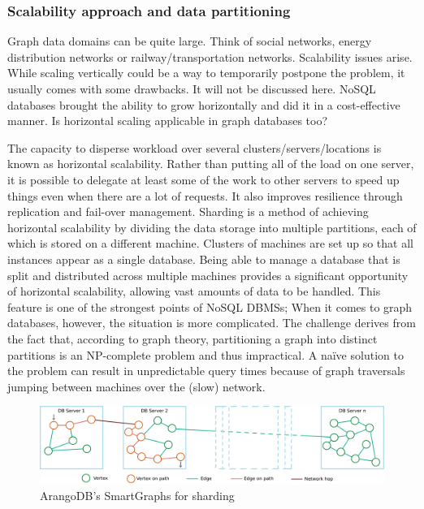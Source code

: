 \subsubsection{Scalability approach and data partitioning}\label{subsubsection:LiteratureReview/ReviewofGraphDatabaseSystems/AGDBMSindetailArangoDB/Scalabilityapproachanddatapartitioning}
Graph data domains can be quite large.
Think of social networks, energy distribution networks or railway/transportation networks.
Scalability issues arise.
While scaling vertically could be a way to temporarily postpone the problem, it usually comes with some drawbacks.
It will not be discussed here.
NoSQL databases brought the ability to grow horizontally and did it in a cost-effective manner.
Is horizontal scaling applicable in graph databases too?

The capacity to disperse workload over several clusters/servers/locations is known as horizontal scalability.
Rather than putting all of the load on one server, it is possible to delegate at least some of the work to other servers to speed up things even when there are a lot of requests.
It also improves resilience through replication and fail-over management.
Sharding is a method of achieving horizontal scalability by dividing the data storage into multiple partitions, each of which is stored on a different machine.
Clusters of machines are set up so that all instances appear as a single database.
Being able to manage a database that is split and distributed across multiple machines provides a significant opportunity of horizontal scalability, allowing vast amounts of data to be handled.
This feature is one of the strongest points of NoSQL DBMSs;
When it comes to graph databases, however, the situation is more complicated.
The challenge derives from the fact that, according to graph theory, partitioning a graph into distinct partitions is an NP-complete problem  and thus impractical.
A na\"ive solution to the problem can result in unpredictable query times because of graph traversals jumping between machines over the (slow) network.

\begin{figure}[H]%
	\centering%
	\includegraphics[width=1\textwidth,%
	]{images/chapter2/arangodbsmartgraphs.pdf}%
	\caption[ArangoDB's SmartGraphs for sharding]{ArangoDB's SmartGraphs for sharding}%
	\label{fig:arangodbsmartgraphs}%
\end{figure}%

